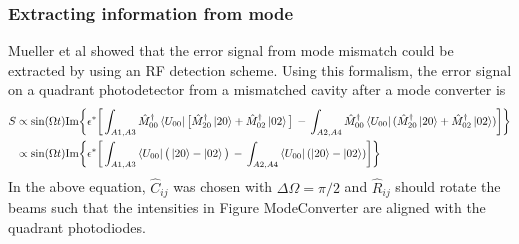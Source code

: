 \subsubsection{Extracting information from mode}
Mueller et al \cite{MuellerMM} showed that the error signal from mode mismatch could be extracted by using an RF detection scheme. Using this formalism, the error signal on a quadrant photodetector from a mismatched cavity after a mode converter is 
	\begin{equation}
	\begin{aligned}
	S 	&\propto \sin(\Omega t) \text{Im} \bigg\{ \epsilon^{*} \bigg[\int_{A1,A3} \hat{M}^{\dagger}_{00} \bra{U_{00}} \big[\hat{M}^{\dagger}_{20} \ket{20} + \hat{M}^{\dagger}_{02} \ket{02}\big]  \,-\, \int_{A2,A4} \hat{M}^{\dagger}_{00} \bra{U_{00}} (\hat{M}^{\dagger}_{20} \ket{20} + \hat{M}^{\dagger}_{02} \ket{02}) \bigg] \bigg\}\\
	&\propto \sin(\Omega t) \text{Im} \bigg\{ \epsilon^{*} \bigg[\int_{A1,A3} \bra{U_{00}} \big(\ket{20} - \ket{02}\big)  \,-\, \int_{A2,A4}  \bra{U_{00}} ( \ket{20} - \ket{02}) \bigg] \bigg\}
	\end{aligned}
	\end{equation}
In the above equation, $\hat{C}_{ij} $ was chosen with $\Delta \Omega = \pi/2$ and $\hat{R}_{ij}$ should rotate the beams such that the intensities in Figure {ModeConverter} are aligned with the quadrant photodiodes.
		
		
